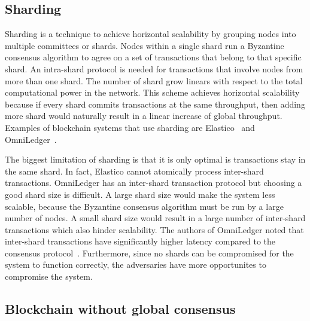 
\subsection{Sharding}

Sharding is a technique to achieve horizontal scalability by grouping nodes into multiple committees or shards.
Nodes within a single shard run a Byzantine consensus algorithm to agree on a set of transactions that belong to that specific shard.
An intra-shard protocol is needed for transactions that involve nodes from more than one shard.
The number of shard grow linears with respect to the total computational power in the network.
This scheme achieves horizontal scalability because if every shard commits transactions at the same throughput,
then adding more shard would naturally result in a linear increase of global throughput.
Examples of blockchain systems that use sharding are Elastico~\cite{luu2016elastico} and OmniLedger~\cite{kokoris2017omniledger}.

The biggest limitation of sharding is that it is only optimal is transactions stay in the same shard.
In fact, Elastico cannot atomically process inter-shard transactions.
OmniLedger has an inter-shard transaction protocol but choosing a good shard size is difficult.
A large shard size would make the system less scalable, because the Byzantine consensus algorithm must be run by a large number of nodes.
A small shard size would result in a large number of inter-shard transactions which also hinder scalability.
The authors of OmniLedger noted that inter-shard transactions have significantly higher latency compared to the consensus protocol~\cite{kokoris2017omniledger}.
Furthermore, since no shards can be compromised for the system to function correctly,
the adversaries have more opportunites to compromise the system.

\subsection{Blockchain without global consensus}

